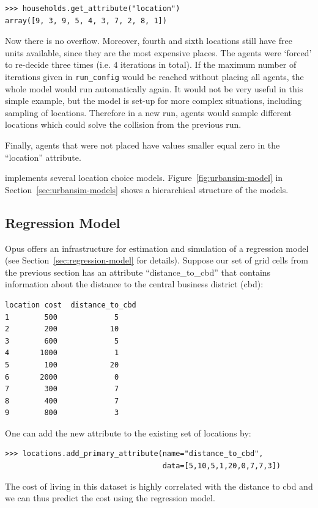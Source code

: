 \begin{verbatim}
>>> households.get_attribute("location")
array([9, 3, 9, 5, 4, 3, 7, 2, 8, 1])
\end{verbatim}
Now there is no overflow. Moreover, fourth and sixth locations still have free
units available, since they are the most expensive places. The agents were `forced'
to re-decide three times (i.e. 4 iterations in total). If the maximum
number of iterations given in \verb|run_config| would be reached without
placing all agents, the whole model would run automatically again. It would not be
very useful in this simple example, but the model is set-up for more complex situations,
including sampling of locations. Therefore in a new run, agents would sample
different locations which could solve the collision from the previous run.

Finally, agents that were not
placed have values smaller equal zero in the ``location'' attribute.

 implements several location choice models.
Figure~\ref{fig:urbansim-model} in Section~\ref{sec:urbansim-models} shows
a hierarchical structure of the models.


%
\subsection{Regression Model}
%
\label{sec:RM}
%
Opus offers an infrastructure for estimation and simulation of a regression model
(see Section~\ref{sec:regression-model} for details).
Suppose our set of grid cells from the previous section has an attribute
``distance_to_cbd'' that contains information about the distance to the
central business district (cbd):

\begin{verbatim}
location cost  distance_to_cbd
1        500             5
2        200            10
3        600             5
4       1000             1
5        100            20
6       2000             0
7        300             7
8        400             7
9        800             3
\end{verbatim}

One can add the new attribute to the existing set of locations by:
\begin{verbatim}
>>> locations.add_primary_attribute(name="distance_to_cbd",
                                    data=[5,10,5,1,20,0,7,7,3])
\end{verbatim}

The cost of living in this dataset is highly correlated with
the distance to cbd and we can thus predict the cost using the regression model.

